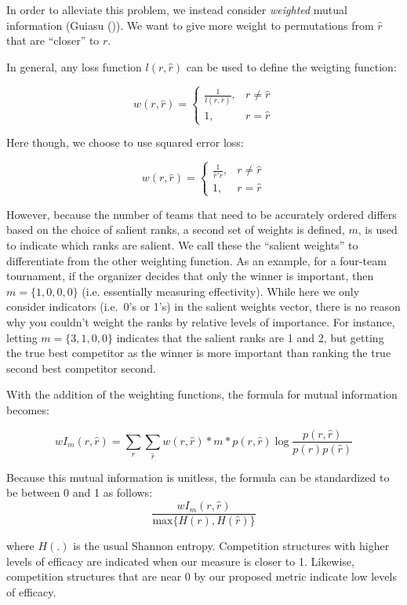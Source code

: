 \documentclass[
  12pt,
]{article}
\begin{document}
In order to alleviate this problem, we instead consider \emph{weighted}
mutual information (Guiasu ()). We
want to give more weight to permutations from \(\hat{r}\) that are
``closer'' to \(r\).

In general, any loss function \(l(r, \hat{r})\) can be used to define
the weigting function:

\[
w(r, \hat{r}) =
\begin{cases}
\frac{1}{l(r, \hat{r})}, & r \ne \hat{r} \\
1, & r = \hat{r}
\end{cases}
\]

Here though, we choose to use squared error loss:

\[
w(r, \hat{r}) =
\begin{cases}
\frac{1}{\hat{r}'r}, & r \ne \hat{r} \\
1, & r = \hat{r}
\end{cases}
\]

However, because the number of teams that need to be accurately ordered
differs based on the choice of salient ranks, a second set of weights is
defined, \(m\), is used to indicate which ranks are salient. We call
these the ``salient weights'' to differentiate from the other weighting
function. As an example, for a four-team tournament, if the organizer
decides that only the winner is important, then \(m = \{1,0,0,0\}\)
(i.e. essentially measuring effectivity). While here we only consider
indicators (i.e.~0's or 1's) in the salient weights vector, there is no
reason why you couldn't weight the ranks by relative levels of
importance. For instance, letting \(m = \{3,1,0,0\}\) indicates that the
salient ranks are 1 and 2, but getting the true best competitor as the
winner is more important than ranking the true second best competitor
second.

With the addition of the weighting functions, the formula for mutual
information becomes:

\[
wI_m(r, \hat{r})=\sum_{r}\sum_{\hat{r}} w(r,\hat{r}) * m * p(r,\hat{r})\log \frac {p(r,\hat{r})}{p(r)p(\hat{r})}
\]

Because this mutual information is unitless, the formula can be
standardized to be between 0 and 1 as follows: \[
\frac{wI_m(r,\hat{r})}{\text{max\{}H(r), H(\hat{r})\}}
\]

where \(H(.)\) is the usual Shannon entropy. Competition structures with
higher levels of efficacy are indicated when our measure is closer to 1.
Likewise, competition structures that are near 0 by our proposed metric
indicate low levels of efficacy.
\end{document}
